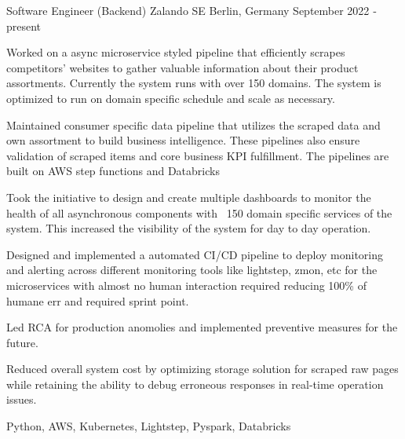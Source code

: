 \cventry
    {Software Engineer (Backend)}
    {Zalando SE}
    {Berlin, Germany}
    {September 2022 ‑ present}
    {
      \begin{cvitems}
        \item {Worked on a async microservice styled pipeline that efficiently scrapes competitors' websites to gather valuable information about their product assortments. Currently the system runs with over 150 domains. The system is optimized to run on domain specific schedule and scale as necessary.}
        \item {Maintained consumer specific data pipeline that utilizes the scraped data and own assortment to build business intelligence. These pipelines also ensure validation of scraped items and core business KPI fulfillment. The pipelines are built on AWS step functions and Databricks}
        \item {Took the initiative to design and create multiple dashboards to monitor the health of all asynchronous components with ~150 domain specific services of the system. This increased the visibility of the system for day to day operation.}
        \item {Designed and implemented a automated CI/CD pipeline to deploy monitoring and alerting across different monitoring tools like lightstep, zmon, etc for the microservices with almost no human interaction required reducing 100\% of humane err and required sprint point.}
        \item {Led RCA for production anomolies and implemented preventive measures for the future.}
        \item {Reduced overall system cost by optimizing storage solution for scraped raw pages while retaining the ability to debug erroneous responses in real-time operation issues.}
      \end{cvitems}
    }
    {Python, AWS, Kubernetes, Lightstep, Pyspark, Databricks}
    